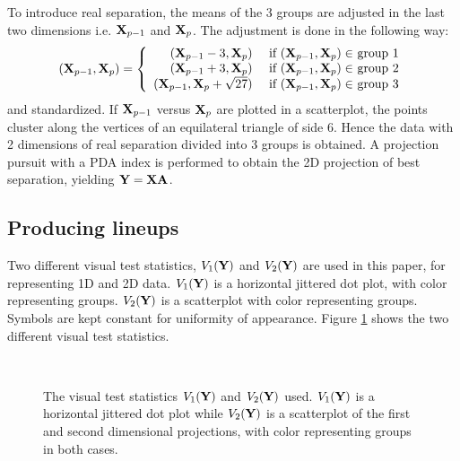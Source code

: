 To introduce real separation, the means of the 3 groups are adjusted in the last two dimensions i.e. $ {\mbox{\boldmath {\bf X}}}_{p-1}$ and ${\mbox{\boldmath {\bf X}}}_p$. The adjustment is done in the following way:
$$
( {\mbox{\boldmath {\bf X}}}_{p-1},  {\mbox{\boldmath {\bf X}}}_p) = \left\{ \begin{array}{rl}
 ( {\mbox{\boldmath {\bf X}}}_{p-1} - 3,  {\mbox{\boldmath {\bf X}}}_p) &\mbox{ if $( {\mbox{\boldmath {\bf X}}}_{p-1},  {\mbox{\boldmath {\bf X}}}_p) \in$ group 1} \\
 ( {\mbox{\boldmath {\bf X}}}_{p-1} + 3,  {\mbox{\boldmath {\bf X}}}_p) &\mbox{ if $({\mbox{\boldmath {\bf X}}}_{p-1},  {\mbox{\boldmath {\bf X}}}_p) \in$ group 2} \\
 ( {\mbox{\boldmath {\bf X}}}_{p-1} ,  {\mbox{\boldmath {\bf X}}}_p + \sqrt{27}) &\mbox{ if $( {\mbox{\boldmath {\bf X}}}_{p-1},  {\mbox{\boldmath {\bf X}}}_p) \in$ group 3}
       \end{array} \right.
$$
and standardized. If $ {\mbox{\boldmath {\bf X}}}_{p-1}$ versus ${\mbox{\boldmath {\bf X}}}_p$ are plotted in a scatterplot, the points cluster along the vertices of an equilateral triangle of side 6. Hence the data with 2 dimensions of real separation divided into 3 groups is obtained. A projection pursuit with a PDA index is performed to obtain the 2D projection of best separation, yielding ${\mbox{\boldmath {\bf Y}}} = {\mbox{\boldmath {\bf X}}}{\mbox{\boldmath {\bf A}}}$. 

\subsection{Producing lineups}

Two different visual test statistics, $V_1({\mbox{\boldmath {\bf Y}}})$ and $V_2({\mbox{\boldmath {\bf Y}}})$ are used in this paper, for representing 1D and 2D data. $V_1({\mbox{\boldmath {\bf Y}}})$ is a horizontal jittered dot plot, with color representing groups. $V_2({\mbox{\boldmath {\bf Y}}})$ is a scatterplot with color representing groups. Symbols are kept constant for uniformity of appearance. Figure \ref{fig3} shows the two different visual test statistics.

\begin{figure}[htbp]
\centering
\mbox{\quad
{}}
\caption{The visual test statistics $V_1({\mbox{\boldmath {\bf Y}}})$ and $V_2({\mbox{\boldmath {\bf Y}}})$ used.  $V_1({\mbox{\boldmath {\bf Y}}})$ is a horizontal jittered dot plot while $V_2({\mbox{\boldmath {\bf Y}}})$ is a scatterplot of the first and second dimensional projections, with color representing groups in both cases. } 
\label{fig3}
\end{figure}

